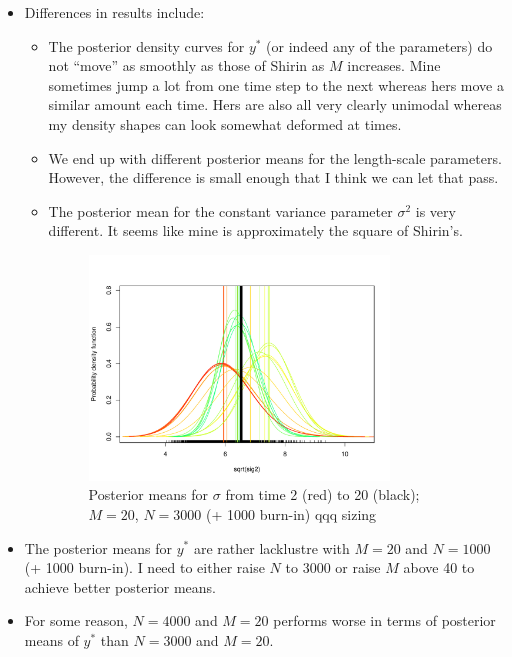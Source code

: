 \documentclass{sfuthesis}
\begin{document}
\begin{itemize}
  \item Differences in results include:
  
  \begin{itemize}

    \item The posterior density curves for $y^*$ (or indeed any of the parameters) do not ``move'' as smoothly as those of Shirin as $M$ increases. Mine sometimes jump a lot from one time step to the next whereas hers move a similar amount each time. Hers are also all very clearly unimodal whereas my density shapes can look somewhat deformed at times.
    \item We end up with different posterior means for the length-scale parameters. However, the difference is small enough that I think we can let that pass. 
    \item The posterior mean for the constant variance parameter $\sigma^2$ is very different. It seems like mine is approximately the square of Shirin's. 

\begin{figure}[H]
  \begin{center}
    \includegraphics[width=0.8\textwidth]{ex2sigma.pdf}
    \vspace{0.1mm}
    \caption{Posterior means for $\sigma$ from time 2 (red) to 20 (black); $M = 20$, $N = 3000$ (+ 1000 burn-in) qqq sizing}
    \label{sigma}
  \end{center}
\end{figure}

  \end{itemize}
  
  \item The posterior means for $y^*$ are rather lacklustre with $M = 20$ and $N = 1000$ (+ 1000 burn-in). I need to either raise $N$ to 3000 or raise $M$ above 40 to achieve better posterior means. 
  \item For some reason, $N = 4000$ and $M = 20$ performs worse in terms of posterior means of $y^*$ than $N = 3000$ and $M = 20$.
  

\end{itemize}
\end{document}
